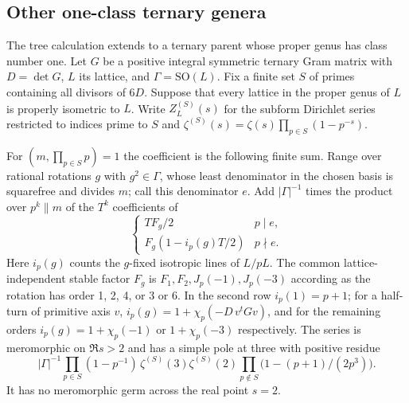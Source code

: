 \subsection*{Other one-class ternary genera}
The tree calculation extends to a ternary parent whose proper
genus has class number one. Let $G$ be a positive integral symmetric
ternary Gram matrix with $D=\det G$, $L$ its lattice, and
$\Gamma=\mathrm{SO}(L)$. Fix a finite set $S$ of primes containing all
divisors of $6D$. Suppose that every lattice in the proper genus of $L$
is properly isometric to $L$. Write $Z_L^{(S)}(s)$ for the subform
Dirichlet series restricted to indices prime to $S$ and
$\zeta^{(S)}(s)=\zeta(s)\prod_{p\in S}(1-p^{-s})$.
\begin{corollary}\label{cor:ternary-genus-one}
For $(m,\prod_{p\in S}p)=1$ the coefficient is the following finite sum.
Range over rational rotations $g$ with $g^2\in\Gamma$, whose least
denominator in the chosen basis is squarefree and divides $m$; call this
denominator $e$. Add $|\Gamma|^{-1}$ times the product over
$p^k\parallel m$ of the $T^k$ coefficients of
\[
 \begin{cases}
 TF_g/2 &p\mid e,\\
 F_g(1-i_p(g)T/2)&p\nmid e.
 \end{cases}
\]
Here $i_p(g)$ counts the $g$-fixed isotropic lines of $L/pL$.
The common lattice-independent stable factor $F_g$ is $F_1,F_2,
J_p(-1),J_p(-3)$ according as the rotation has order 1, 2, 4, or 3
or 6. In the second row $i_p(1)=p+1$; for a half-turn of primitive
axis $v$,
$i_p(g)=1+\chi_p(-D\,v^tGv)$, and for the remaining orders
$i_p(g)=1+\chi_p(-1)$ or $1+\chi_p(-3)$ respectively.
The series is meromorphic on $\Re s>2$ and has a simple pole at three
with positive residue
\[
 |\Gamma|^{-1}\prod_{p\in S}(1-p^{-1})\,
 \zeta^{(S)}(3)\zeta^{(S)}(2)
 \prod_{p\notin S}\big(1-(p+1)/(2p^3)\big).
\]
It has no meromorphic germ across the real point $s=2$.
\end{corollary}

